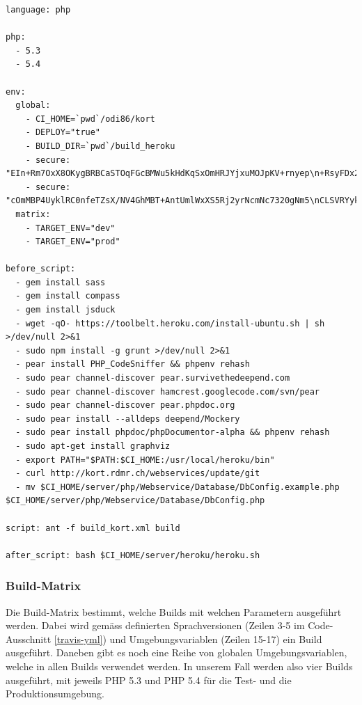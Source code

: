 \lstset{language=XML}
\begin{lstlisting}[float, caption=Die Travis CI Konfigurationsdatei .travis.yml, label=travis-yml]
language: php

php:
  - 5.3
  - 5.4

env:
  global:
    - CI_HOME=`pwd`/odi86/kort
    - DEPLOY="true"
    - BUILD_DIR=`pwd`/build_heroku
    - secure: "EIn+Rm7OxX8OKygBRBCaSTOqFGcBMWu5kHdKqSxOmHRJYjxuMOJpKV+rnyep\n+RsyFDx2Z9yKlqRRS4cpZh7M6wwC63EV46+7aWtzzTjnbMZfVzLQA9EmaEU4\nYMsKGtpQk2mhvaNKd3UbEpDl0Zq74NnAY0zipx0l02UymcFnZEc="
    - secure: "cOmMBP4UyklRC0nfeTZsX/NV4GhMBT+AntUmlWxXS5Rj2yrNcmNc7320gNm5\nCLSVRYyk7/8feyUEMznWrUn/62htZp0tEBAWtXg86dgIZgH4HPy9l2pKuSsH\nxZTHgjUJI7JOuyLG4ID9D5maVLE35UWag/NEtcRVy5QXLZOrs0M="
  matrix:
    - TARGET_ENV="dev"
    - TARGET_ENV="prod"

before_script:
  - gem install sass
  - gem install compass
  - gem install jsduck
  - wget -qO- https://toolbelt.heroku.com/install-ubuntu.sh | sh >/dev/null 2>&1
  - sudo npm install -g grunt >/dev/null 2>&1
  - pear install PHP_CodeSniffer && phpenv rehash
  - sudo pear channel-discover pear.survivethedeepend.com
  - sudo pear channel-discover hamcrest.googlecode.com/svn/pear
  - sudo pear channel-discover pear.phpdoc.org
  - sudo pear install --alldeps deepend/Mockery
  - sudo pear install phpdoc/phpDocumentor-alpha && phpenv rehash
  - sudo apt-get install graphviz
  - export PATH="$PATH:$CI_HOME:/usr/local/heroku/bin"
  - curl http://kort.rdmr.ch/webservices/update/git
  - mv $CI_HOME/server/php/Webservice/Database/DbConfig.example.php $CI_HOME/server/php/Webservice/Database/DbConfig.php

script: ant -f build_kort.xml build

after_script: bash $CI_HOME/server/heroku/heroku.sh
\end{lstlisting}

\subsubsection{Build-Matrix}
Die Build-Matrix bestimmt, welche Builds mit welchen Parametern ausgeführt werden.
Dabei wird gemäss definierten Sprachversionen (Zeilen 3-5 im Code-Ausschnitt \ref{travis-yml}) und Umgebungsvariablen (Zeilen 15-17) ein Build ausgeführt.
Daneben gibt es noch eine Reihe von globalen Umgebungsvariablen, welche in allen Builds verwendet werden.
In unserem Fall werden also vier Builds ausgeführt, mit jeweils PHP 5.3 und PHP 5.4 für die Test- und die Produktionsumgebung.

